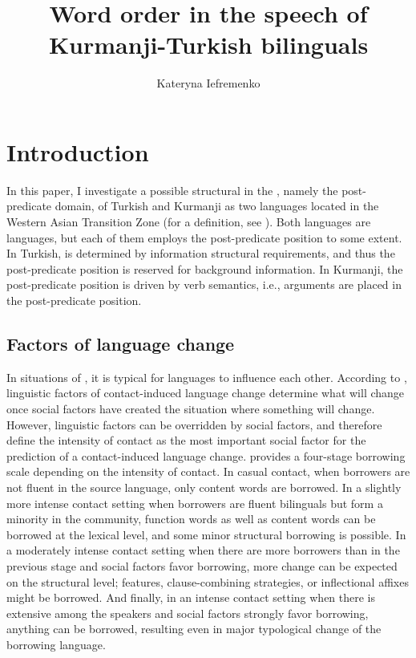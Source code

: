 \documentclass[output=paper,colorlinks,citecolor=brown]{langscibook}
\author{Kateryna Iefremenko\orcid{0000-0003-3711-0935}\affiliation{Leibniz-Centre General Linguistics; University of Potsdam}}
\title{Word order in the speech of Kurmanji-Turkish bilinguals}
\begin{document}
\maketitle\label{WOWA:ch:2}


\section{Introduction}\label{Bilingual:ss:1}

In this paper, I investigate a possible structural  in the , namely the post-predicate domain, of Turkish and Kurmanji as two languages located in the Western Asian Transition Zone (for a definition, see ). Both languages are  languages, but each of them employs the post-predicate position to some extent. In Turkish,  is determined by information structural requirements, and thus the post-predicate position is reserved for background information. In Kurmanji, the post-predicate position is driven by verb semantics, i.e.,  arguments are placed in the post-predicate position.

\subsection{Factors of language change}\label{Bilingual:ss:1.1}

\largerpage

\begin{sloppypar}
In situations of , it is typical for languages to influence each other. According to \citet{thomason2001language}, linguistic factors of contact-induced language change determine what will change once social factors have created the situation where something will change. However, linguistic factors can be overridden by social factors, and therefore \citet{thomason1988language} define the intensity of contact as the most important social factor for the prediction of a contact-induced language change. \citet{thomason2001language} provides a four-stage borrowing scale depending on the intensity of contact. In casual contact, when borrowers are not fluent in the source language, only content words are borrowed. In a slightly more intense contact setting when borrowers are fluent bilinguals but form a minority in the community, function words as well as content words can be borrowed at the lexical level, and some minor structural borrowing is possible. In a moderately intense contact setting when there are more borrowers than in the previous stage and social factors favor borrowing, more change can be expected on the structural level;  features, clause-combining strategies, or inflectional affixes might be borrowed. And finally, in an intense contact setting when there is extensive  among the speakers and social factors strongly favor borrowing, anything can be borrowed, resulting even in major typological change of the borrowing language. 
\end{sloppypar}
\end{document}
